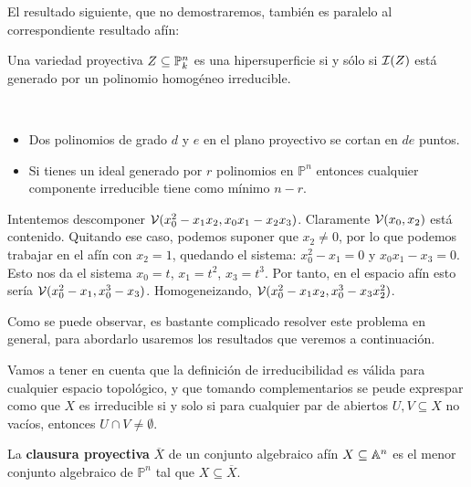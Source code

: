 \documentclass[ACGA.tex]{subfiles}
\begin{document}
El resultado siguiente, que no demostraremos, también es paralelo al correspondiente resultado afín:

\begin{prop}\label{principalproy}
 Una variedad proyectiva $Z\subseteq\mathbb{P}^n_k$ es una hipersuperficie si y sólo si $\mathcal{I}(Z)$ está generado por un polinomio homogéneo irreducible. 
\end{prop}

\begin{nota}\
\begin{itemize}


\item Dos polinomios de grado $d$ y $e$ en el plano proyectivo se cortan en $de$ puntos.

\item Si tienes un ideal generado por $r$ polinomios en $\mathbb{P}^n$ entonces cualquier componente irreducible tiene como mínimo $n-r$.
\end{itemize}
\end{nota}

\begin{ejer}
Intentemos descomponer $\mathcal{V}(x_0^2-x_1x_2,x_0x_1-x_2x_3)$. Claramente $\mathcal{V}(x_0,x_2)$ está contenido. Quitando ese caso, podemos suponer que $x_2\neq 0$, por lo que podemos trabajar en el afín con $x_2=1$, quedando el sistema: $x_0^2-x_1=0$ y $x_0x_1-x_3=0$. Esto nos da el sistema $x_0 = t$, $x_1=t^2$, $x_3=t^3$. Por tanto, en el espacio afín esto sería $\mathcal{V}(x_0^2-x_1,x_0^3-x_3)$. Homogeneizando, $\mathcal{V}(x_0^2-x_1x_2,x_0^3-x_3x_2^2)$. 

Como se puede observar, es bastante complicado resolver este problema en general, para abordarlo usaremos los resultados que veremos a continuación.

 
\end{ejer}

Vamos a tener en cuenta que la definición de irreducibilidad es válida para cualquier espacio topológico, y que tomando complementarios se peude exprespar como que $X$ es irreducible si y solo si para cualquier par de abiertos $U,V\subseteq X$ no vacíos, entonces $U\cap V\neq\emptyset$.

\begin{defi}
La \textbf{clausura proyectiva} $\overline{X}$ de un conjunto algebraico afín $X\subseteq\mathbb{A}^n$ es el menor conjunto algebraico de $\mathbb{P}^n$ tal que $X\subseteq\overline{X}$.
\end{defi}
\end{document}

